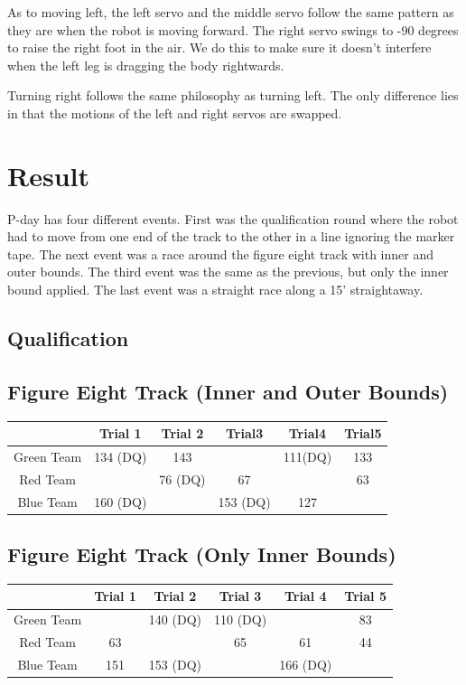 \documentclass[a4paper, 12pt, oneside]{article} %
\begin{document}
\begin{itemize}
		As to moving left, the left servo and the middle servo follow the same pattern as they are when the robot is moving forward. The right servo swings to -90 degrees to raise the right foot in the air. We do this to make sure it doesn't interfere when the left leg is dragging the body rightwards.
		
		Turning right follows the same philosophy as turning left. The only difference lies in that the motions of the left and right servos are swapped. 
\end{itemize}
\section{Result}
P-day has four different events. First was the qualification round where the robot had to move from one end of the track to the other in a line ignoring the marker tape. The next event was a race around the figure eight track with inner and outer bounds. The third event was the same as the previous, but only the inner bound applied. The last event was a straight race along a 15’ straightaway.
\subsection{Qualification}
\subsection{Figure Eight Track (Inner and Outer Bounds)}
\begin{table}[htbp]
	\centering
	\begin{tabular}{c|ccccc}
		&Trial 1&Trial 2&Trial3&Trial4&Trial5\\
		\hline
		Green Team &134 (DQ)& 143& &111(DQ)& 133\\
		
		Red Team& & 76 (DQ)&67& &63\\
		
		
		Blue Team& 160 (DQ)& &153 (DQ)& 127& \\
		
	\end{tabular}
\end{table}
\subsection{Figure Eight Track (Only Inner Bounds)}
\begin{table}[htbp]
	\centering
	\begin{tabular}{c|ccccc}
		&Trial 1& Trial 2& Trial 3& Trial 4& Trial 5\\
		\hline 
		Green Team&& 140 (DQ)&110 (DQ)&&83\\
		Red Team& 63&& 65& 61& 44\\
		Blue Team& 151& 153 (DQ)& &166 (DQ)&\\
	\end{tabular}
\end{table}
\end{document}
